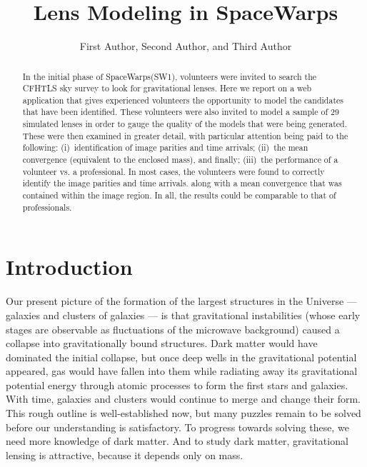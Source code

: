 \documentclass[12pt,preprint]{aastex}
\newcommand{\sw}{SpaceWarps\xspace}
\begin{document}
\title{Lens Modeling in \sw}
\author{First Author,
Second Author, and
Third Author}

\begin{abstract}
In the initial phase of \sw (SW1), volunteers were invited to search the CFHTLS sky survey to look for gravitational lenses.
Here we report on a web application that gives experienced volunteers the opportunity to model the candidates that have been identified.
These volunteers were also invited to model a sample of 29 simulated lenses in order to gauge the quality of the models that were being generated.
These were then examined in greater detail, with particular attention being paid to the following:
(i)~identification of image parities and time arrivals;
(ii)~the mean convergence (equivalent to the enclosed mass), and finally;
(iii)~the performance of a volunteer vs. a professional.
In most cases, the volunteers were found to correctly identify the image parities and time arrivals.
 along with a mean convergence that was contained within the image region.
In all, the results could be comparable to that of professionals.


\end{abstract}

\keywords{}
\section{Introduction}


Our present picture of the formation of the largest structures in the
Universe --- galaxies and clusters of galaxies --- is that
gravitational instabilities (whose early stages are observable as
fluctuations of the microwave background) caused a collapse into
gravitationally bound structures.  Dark matter would have dominated
the initial collapse, but once deep wells in the gravitational
potential appeared, gas would have fallen into them while radiating
away its gravitational potential energy through atomic processes to
form the first stars and galaxies.  With time, galaxies and clusters
would continue to merge and change their form.  This rough outline is
well-established now, but many puzzles remain to be solved before our
understanding is satisfactory.  To progress towards solving these, we
need more knowledge of dark matter.  And to study dark matter,
gravitational lensing is attractive, because it depends only on mass.
\end{document}
